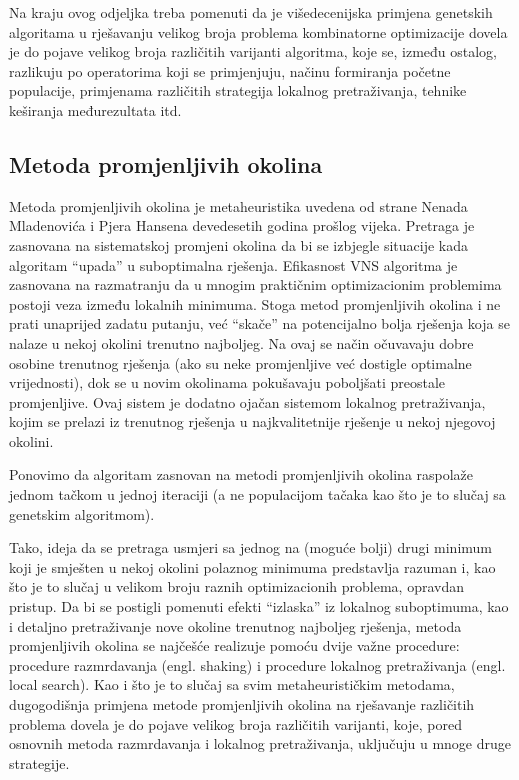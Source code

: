 \documentclass[a4paper, utf8, 11pt, colorlinks]{book}
\begin{document}
Na kraju ovog odjeljka treba pomenuti da je višedecenijska primjena genetskih algoritama u rješavanju velikog broja problema kombinatorne optimizacije dovela je do pojave velikog broja različitih varijanti algoritma, koje se, između ostalog, razlikuju po operatorima koji se primjenjuju, načinu formiranja početne populacije, primjenama različitih strategija lokalnog pretraživanja, tehnike keširanja međurezultata itd. 


\subsection{Metoda promjenljivih okolina}\label{intro:vns}
Metoda promjenljivih okolina je metaheuristika uvedena od strane Nenada Mladenovića i Pjera Hansena devedesetih godina prošlog vijeka.
Pretraga je zasnovana na sistematskoj promjeni okolina da bi se izbjegle situacije kada algoritam ``upada'' u suboptimalna rješenja. Efikasnost VNS algoritma je zasnovana na razmatranju da u mnogim praktičnim optimizacionim problemima postoji veza između lokalnih minimuma. Stoga metod promjenljivih okolina i ne prati unaprijed zadatu putanju, već ``skače'' na potencijalno bolja rješenja koja se nalaze u nekoj okolini trenutno najboljeg.
Na ovaj se način očuvavaju dobre osobine trenutnog rješenja (ako su neke promjenljive već dostigle optimalne vrijednosti), dok se u novim okolinama pokušavaju poboljšati preostale promjenljive. Ovaj sistem je dodatno ojačan sistemom lokalnog pretraživanja, kojim se prelazi iz trenutnog rješenja u najkvalitetnije rješenje u nekoj njegovoj okolini.

Ponovimo da algoritam zasnovan na metodi promjenljivih okolina raspolaže jednom tačkom u jednoj iteraciji (a ne populacijom tačaka kao što je to slučaj sa genetskim algoritmom).

Tako, ideja da se pretraga usmjeri sa jednog na (moguće bolji) drugi minimum koji je smješten u nekoj okolini polaznog minimuma predstavlja razuman  i, kao što je to slučaj u velikom broju raznih optimizacionih problema, opravdan pristup.
Da bi se postigli pomenuti efekti ``izlaska'' iz lokalnog suboptimuma, kao i detaljno pretraživanje nove okoline trenutnog najboljeg rješenja, metoda promjenljivih okolina se najčešće realizuje pomoću dvije važne procedure: procedure razmrdavanja (engl. shaking) i procedure lokalnog pretraživanja (engl. local search). Kao i što je to slučaj sa svim metaheurističkim metodama, dugogodišnja primjena metode promjenljivih okolina na rješavanje različitih problema dovela je do pojave velikog broja različitih varijanti, koje, pored osnovnih metoda razmrdavanja i lokalnog pretraživanja, uključuju u mnoge druge strategije.
\end{document}

